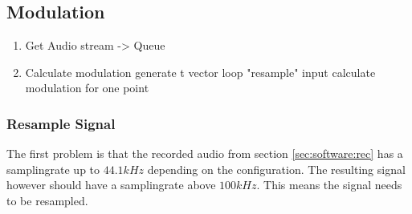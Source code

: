 \subsection{Modulation}

\begin{enumerate}
  \item Get Audio stream -> Queue
  \item Calculate modulation
  \subitem generate t vector
  \subitem loop
  \subitem "resample" input
  \subitem calculate modulation for one point
\end{enumerate}
%
%
\subsubsection*{Resample Signal}
%
The first problem is that the recorded audio from section \ref{sec:software:rec} has a samplingrate up to $44.1kHz$ depending on the configuration. The resulting signal however should have a samplingrate above $100kHz$. This means the signal needs to be resampled.